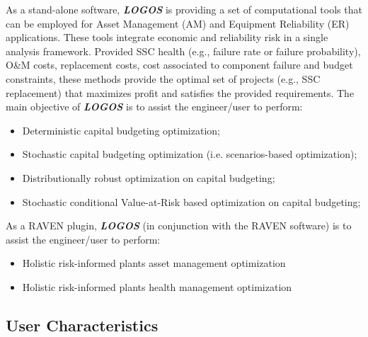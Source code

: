 As a stand-alone software, \textbf{\textit{LOGOS}} is providing a set of computational tools that can be
employed for Asset Management (AM) and Equipment Reliability (ER) applications.
These tools integrate economic and reliability risk in a single analysis framework.
Provided SSC health (e.g., failure rate or failure probability), O&M costs,
replacement costs, cost associated to component failure and budget constraints,
these methods provide the optimal set of projects (e.g., SSC replacement) that
maximizes profit and satisfies the provided requirements. The main objective of
\textbf{\textit{LOGOS}} is to assist the engineer/user to perform:

\begin{itemize}
  \item Deterministic capital budgeting optimization;
  \item Stochastic capital budgeting optimization (i.e. scenarios-based optimization);
  \item Distributionally robust optimization on capital budgeting;
  \item Stochastic conditional Value-at-Risk based optimization on capital budgeting;
\end{itemize}

As a RAVEN plugin, \textbf{\textit{LOGOS}} (in conjunction with the RAVEN software)
is to assist the engineer/user to perform:
\begin{itemize}
  \item Holistic risk-informed plants asset management optimization
  \item Holistic risk-informed plants health management optimization
\end{itemize}

\subsection{User Characteristics}


